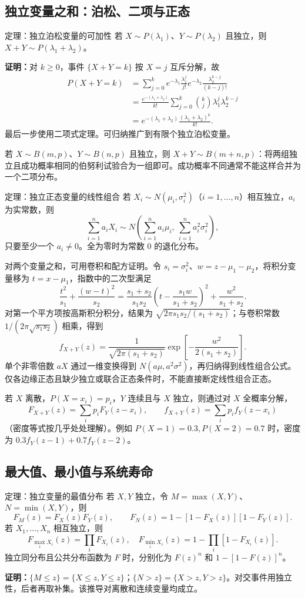\documentclass[UTF8,fontset=none,zihao=-4,a4paper]{ctexart}
\newcommand{\proof}{\par\noindent\textbf{证明：}}
\newcommand{\com}[2]{\binom{#1}{#2}}
\begin{document}
\subsection{独立变量之和：泊松、二项与正态}
\begin{infobox}{定理：独立泊松变量的可加性}
若 $X\sim P(\lambda_1)$、$Y\sim P(\lambda_2)$ 且独立，则 $X+Y\sim P(\lambda_1+\lambda_2)$。
\end{infobox}
\proof 对 $k\ge0$，事件 $\{X+Y=k\}$ 按 $X=j$ 互斥分解，故
\begin{align*}
P(X+Y=k)
&=\sum_{j=0}^k e^{-\lambda_1}\frac{\lambda_1^j}{j!}
 e^{-\lambda_2}\frac{\lambda_2^{k-j}}{(k-j)!}\\
&=\frac{e^{-(\lambda_1+\lambda_2)}}{k!}
\sum_{j=0}^k\com kj\lambda_1^j\lambda_2^{k-j}\\
&=e^{-(\lambda_1+\lambda_2)}\frac{(\lambda_1+\lambda_2)^k}{k!}.
\end{align*}
最后一步使用二项式定理。可归纳推广到有限个独立泊松变量。

若 $X\sim B(m,p)$、$Y\sim B(n,p)$ 且独立，则 $X+Y\sim B(m+n,p)$：将两组独立且成功概率相同的伯努利试验合为一组即可。成功概率不同通常不能这样合并为一个二项分布。
\begin{infobox}{定理：独立正态变量的线性组合}
若 $X_i\sim N(\mu_i,\sigma_i^2)$（$i=1,\ldots,n$）相互独立，$a_i$ 为实常数，则
\[
\sum_{i=1}^n a_iX_i\sim
N\left(\sum_{i=1}^n a_i\mu_i,\ \sum_{i=1}^n a_i^2\sigma_i^2\right),
\]
只要至少一个 $a_i\ne0$。全为零时为常数 $0$ 的退化分布。
\end{infobox}
对两个变量之和，可用卷积和配方证明。令 $s_i=\sigma_i^2$、$w=z-\mu_1-\mu_2$，将积分变量移为 $t=x-\mu_1$，指数中的二次型满足
\[
\frac{t^2}{s_1}+\frac{(w-t)^2}{s_2}
=\frac{s_1+s_2}{s_1s_2}\left(t-\frac{s_1w}{s_1+s_2}\right)^2
+\frac{w^2}{s_1+s_2}.
\]
对第一个平方项按高斯积分积分，结果为 $\sqrt{2\pi s_1s_2/(s_1+s_2)}$；与卷积常数 $1/(2\pi\sqrt{s_1s_2})$ 相乘，得到
\[
f_{X+Y}(z)=\frac1{\sqrt{2\pi(s_1+s_2)}}
\exp\left[-\frac{w^2}{2(s_1+s_2)}\right].
\]
单个非零倍数 $aX$ 通过一维变换得到 $N(a\mu,a^2\sigma^2)$，再归纳得到线性组合公式。仅各边缘正态且缺少独立或联合正态条件时，不能直接断定线性组合正态。

若 $X$ 离散，$P(X=x_i)=p_i$，$Y$ 连续且与 $X$ 独立，则通过对 $X$ 全概率分解，
\[
F_{X+Y}(z)=\sum_i p_iF_Y(z-x_i),\qquad
f_{X+Y}(z)=\sum_i p_if_Y(z-x_i)
\]
（密度等式按几乎处处理解）。例如 $P(X=1)=0.3,P(X=2)=0.7$ 时，密度为 $0.3f_Y(z-1)+0.7f_Y(z-2)$。
\subsection{最大值、最小值与系统寿命}
\begin{infobox}{定理：独立变量的最值分布}
若 $X,Y$ 独立，令 $M=\max(X,Y)$、$N=\min(X,Y)$，则
\[
F_M(z)=F_X(z)F_Y(z),\qquad
F_N(z)=1-[1-F_X(z)][1-F_Y(z)].
\]
若 $X_1,\ldots,X_n$ 相互独立，则
\[
F_{\max_iX_i}(z)=\prod_i F_{X_i}(z),\quad
F_{\min_iX_i}(z)=1-\prod_i[1-F_{X_i}(z)].
\]
独立同分布且公共分布函数为 $F$ 时，分别化为 $F(z)^n$ 和 $1-[1-F(z)]^n$。
\end{infobox}
\proof $\{M\le z\}=\{X\le z,Y\le z\}$；$\{N>z\}=\{X>z,Y>z\}$。对交事件用独立性，后者再取补集。该推导对离散和连续变量均成立。
\end{document}
